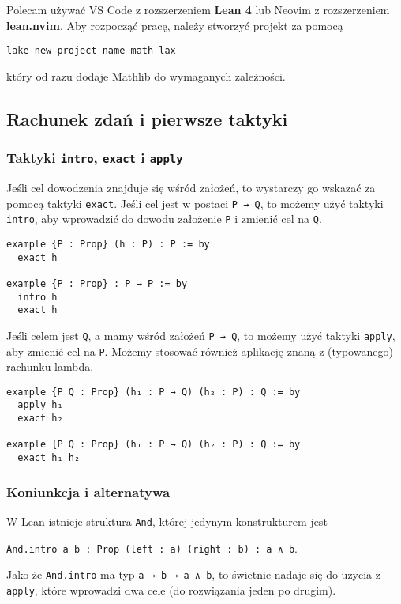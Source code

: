 \documentclass[polish,pretty]{angav}
\newcommand{\Lean}[1]{\texttt{#1}}
\newcommand{\centerLean}[2][]{\begin{center}\Lean{#2}#1\end{center}}
\begin{document}
Polecam używać VS Code z rozszerzeniem \textbf{Lean 4} lub Neovim z rozszerzeniem \textbf{lean.nvim}.
Aby rozpocząć pracę, należy stworzyć projekt za pomocą
\begin{verbatim}
lake new project-name math-lax
\end{verbatim}
który od razu dodaje Mathlib do wymaganych zależności.


\subsection{Rachunek zdań i pierwsze taktyki}

\subsubsection*{Taktyki \texttt{intro}, \texttt{exact} i \texttt{apply}}

Jeśli cel dowodzenia znajduje się wśród założeń, to wystarczy go wskazać za pomocą taktyki \Lean{exact}. Jeśli cel jest w postaci \Lean{P → Q}, to możemy użyć taktyki \Lean{intro}, aby wprowadzić do dowodu założenie \Lean{P} i zmienić cel na \Lean{Q}.
\begin{verbatim}
example {P : Prop} (h : P) : P := by
  exact h

example {P : Prop} : P → P := by
  intro h
  exact h
\end{verbatim}

Jeśli celem jest \Lean{Q}, a mamy wśród założeń \Lean{P → Q}, to możemy użyć taktyki \Lean{apply}, aby zmienić cel na \Lean{P}. Możemy stosować również aplikację znaną z (typowanego) rachunku lambda.
\begin{verbatim}
example {P Q : Prop} (h₁ : P → Q) (h₂ : P) : Q := by
  apply h₁
  exact h₂

example {P Q : Prop} (h₁ : P → Q) (h₂ : P) : Q := by
  exact h₁ h₂
\end{verbatim}

\subsubsection*{Koniunkcja i alternatywa}

W Lean istnieje struktura \Lean{And}, której jedynym konstrukturem jest
\centerLean[.]{And.intro {a b : Prop} (left : a) (right : b) : a ∧ b}
Jako że \Lean{And.intro} ma typ \Lean{a → b → a ∧ b}, to świetnie nadaje się do użycia z \Lean{apply}, które wprowadzi dwa cele (do rozwiązania jeden po drugim).
\end{document}
